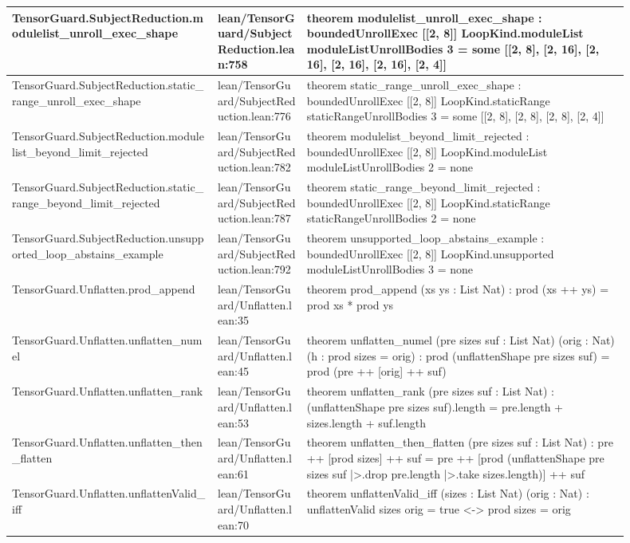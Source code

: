 \documentclass[10pt]{article}
\begin{document}
\begin{longtable}{|p{0.30\linewidth}|p{0.13\linewidth}|p{0.47\linewidth}|}
\hline
TensorGuard.SubjectReduction.modulelist\_unroll\_exec\_shape & lean/TensorGuard/SubjectReduction.lean:758 & theorem modulelist\_unroll\_exec\_shape : boundedUnrollExec [[2, 8]] LoopKind.moduleList moduleListUnrollBodies 3 = some [[2, 8], [2, 16], [2, 16], [2, 16], [2, 16], [2, 4]] \\
\hline
TensorGuard.SubjectReduction.static\_range\_unroll\_exec\_shape & lean/TensorGuard/SubjectReduction.lean:776 & theorem static\_range\_unroll\_exec\_shape : boundedUnrollExec [[2, 8]] LoopKind.staticRange staticRangeUnrollBodies 3 = some [[2, 8], [2, 8], [2, 8], [2, 4]] \\
\hline
TensorGuard.SubjectReduction.modulelist\_beyond\_limit\_rejected & lean/TensorGuard/SubjectReduction.lean:782 & theorem modulelist\_beyond\_limit\_rejected : boundedUnrollExec [[2, 8]] LoopKind.moduleList moduleListUnrollBodies 2 = none \\
\hline
TensorGuard.SubjectReduction.static\_range\_beyond\_limit\_rejected & lean/TensorGuard/SubjectReduction.lean:787 & theorem static\_range\_beyond\_limit\_rejected : boundedUnrollExec [[2, 8]] LoopKind.staticRange staticRangeUnrollBodies 2 = none \\
\hline
TensorGuard.SubjectReduction.unsupported\_loop\_abstains\_example & lean/TensorGuard/SubjectReduction.lean:792 & theorem unsupported\_loop\_abstains\_example : boundedUnrollExec [[2, 8]] LoopKind.unsupported moduleListUnrollBodies 3 = none \\
\hline
TensorGuard.Unflatten.prod\_append & lean/TensorGuard/Unflatten.lean:35 & theorem prod\_append (xs ys : List Nat) : prod (xs ++ ys) = prod xs * prod ys \\
\hline
TensorGuard.Unflatten.unflatten\_numel & lean/TensorGuard/Unflatten.lean:45 & theorem unflatten\_numel (pre sizes suf : List Nat) (orig : Nat) (h : prod sizes = orig) : prod (unflattenShape pre sizes suf) = prod (pre ++ [orig] ++ suf) \\
\hline
TensorGuard.Unflatten.unflatten\_rank & lean/TensorGuard/Unflatten.lean:53 & theorem unflatten\_rank (pre sizes suf : List Nat) : (unflattenShape pre sizes suf).length = pre.length + sizes.length + suf.length \\
\hline
TensorGuard.Unflatten.unflatten\_then\_flatten & lean/TensorGuard/Unflatten.lean:61 & theorem unflatten\_then\_flatten (pre sizes suf : List Nat) : pre ++ [prod sizes] ++ suf = pre ++ [prod (unflattenShape pre sizes suf |>.drop pre.length |>.take sizes.length)] ++ suf \\
\hline
TensorGuard.Unflatten.unflattenValid\_iff & lean/TensorGuard/Unflatten.lean:70 & theorem unflattenValid\_iff (sizes : List Nat) (orig : Nat) : unflattenValid sizes orig = true <-> prod sizes = orig \\

\end{longtable}
\end{document}
